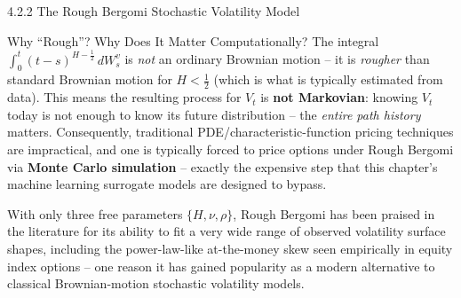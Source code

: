 \documentclass[aspectratio=169,10pt]{beamer}
\begin{document}
\begin{frame}[allowframebreaks]{4.2.2 The Rough Bergomi Stochastic Volatility Model}
\framebreak

\begin{alertblock}{Why ``Rough''? Why Does It Matter Computationally?}
The integral $\int_0^t (t-s)^{H-\frac12}\,dW_s^v$ is \emph{not} an
ordinary Brownian motion -- it is \emph{rougher} than standard Brownian
motion for $H < \tfrac12$ (which is what is typically estimated from
data). This means the resulting process for $V_t$ is \textbf{not
Markovian}: knowing $V_t$ today is not enough to know its future
distribution -- the \emph{entire path history} matters. Consequently,
traditional PDE/characteristic-function pricing techniques are
impractical, and one is typically forced to price options under Rough
Bergomi via \textbf{Monte Carlo simulation} -- exactly the expensive step
that this chapter's machine learning surrogate models are designed to
bypass.
\end{alertblock}

With only three free parameters $\{H, \nu, \rho\}$, Rough Bergomi has been
praised in the literature for its ability to fit a very wide range of
observed volatility surface shapes, including the power-law-like
at-the-money skew seen empirically in equity index options -- one reason
it has gained popularity as a modern alternative to classical
Brownian-motion stochastic volatility models.

\end{frame}
\end{document}
